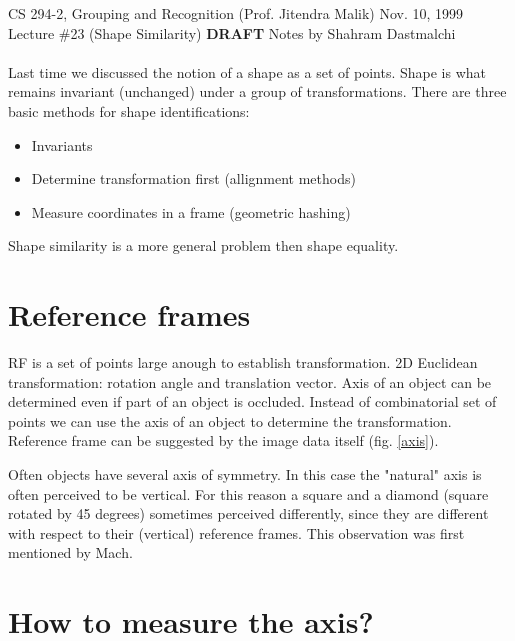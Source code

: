 

\newcommand{\lecturetitle}[4]{
  \noindent
  CS 294-2, Grouping and Recognition (Prof. Jitendra Malik) \hfill #3\\
  Lecture \##1 (#2) \hfill {\bf DRAFT} Notes by #4\\[-.05in]
  \mbox{}\hrulefill \mbox{}\\}



\lecturetitle{23}{Shape Similarity}{Nov. 10, 1999}{Shahram Dastmalchi}

Last time we discussed the notion of a shape as a set of points. Shape is what remains invariant (unchanged) under a group of transformations. There are three basic methods for shape identifications:
\begin{itemize} 
  \item Invariants
  \item Determine transformation first (allignment methods)
  \item Measure coordinates in a frame (geometric hashing)
\end{itemize}
Shape similarity is a more general problem then shape equality.


\section{Reference frames}
RF is a set of points large anough to establish transformation. 2D Euclidean transformation: rotation angle and translation vector. Axis of an object can be determined even if part of an object is occluded. Instead of combinatorial set of points we can use the axis of an object to determine the transformation. Reference frame can be suggested by the image data itself (fig. \ref{axis}).

Often objects have several axis of symmetry. In this case the "natural" axis is often perceived to be vertical. For this reason a square and a diamond (square rotated by 45 degrees) sometimes perceived differently, since they are different with respect to their (vertical) reference frames. This observation was first mentioned by Mach.

\section{How to measure the axis?}
